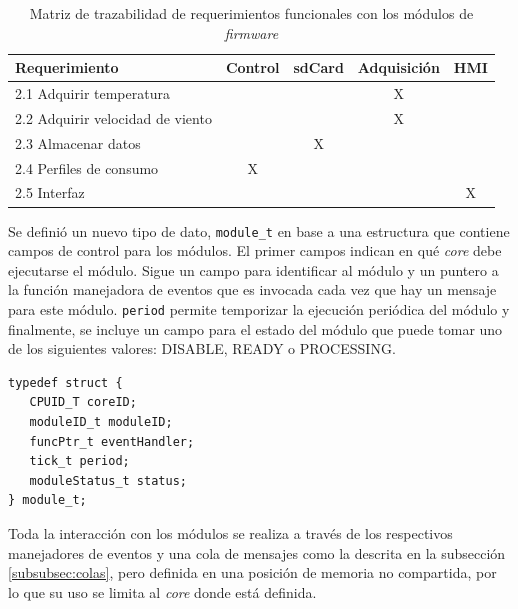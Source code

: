 \begin{table}[ht]
\caption[Matriz de trazabilidad de requerimientos funcionales]{Matriz de trazabilidad de requerimientos funcionales con los módulos de \textit{firmware}}
\label{tab:trazabilidad}
\begin{tabular}{lcccc}
\toprule
\textbf{Requerimiento} & \textbf{Control} & \textbf{sdCard} & \textbf{Adquisición} & \textbf{HMI} \\ \midrule
2.1 Adquirir temperatura                   &                  &                 & X                    &              \\ %
2.2 Adquirir velocidad de viento           &                  &                 & X                    &              \\ %
2.3 Almacenar datos                        &                  & X               &                      &              \\ %
2.4 Perfiles de consumo                    & X                &                 &                      &              \\ %
2.5 Interfaz                               &                  &                 &                      & X            \\ \bottomrule
\end{tabular}
\end{table}

Se definió un nuevo tipo de dato, \texttt{module\_t} en base a una estructura que contiene campos de control para los módulos. El primer campos indican en qué \textit{core} debe ejecutarse el módulo. Sigue un campo para identificar al módulo y un puntero a la función manejadora de eventos que es invocada cada vez que hay un mensaje para este módulo. \texttt{period} permite temporizar la ejecución periódica del módulo y finalmente, se incluye un campo para el estado del módulo que puede tomar uno de los siguientes valores: DISABLE, READY o PROCESSING.

\vspace{10px}

\begin{verbatim}
typedef struct {
   CPUID_T coreID;
   moduleID_t moduleID;
   funcPtr_t eventHandler;
   tick_t period;
   moduleStatus_t status;
} module_t;
\end{verbatim}

\vspace{10px}

Toda la interacción con los módulos se realiza a través de los respectivos manejadores de eventos y una cola de mensajes como la descrita en la subsección \ref{subsubsec:colas}, pero definida en una posición de memoria no compartida, por lo que su uso se limita al \textit{core} donde está definida.

